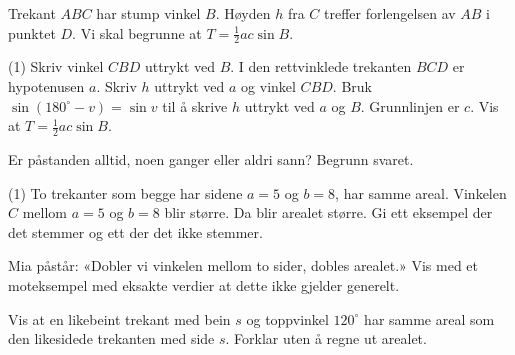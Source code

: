 Trekant $ABC$ har stump vinkel $B$. Høyden $h$ fra $C$ treffer forlengelsen av $AB$ i punktet $D$. Vi skal begrunne at $T = \frac12 ac\sin B$.\par
\begin{minipage}[t]{0.38\linewidth}
\end{minipage}\hfill
\begin{minipage}[t]{0.58\linewidth}
\begin{tasks}(1)
  \task Skriv vinkel $CBD$ uttrykt ved $B$.
  \task I den rettvinklede trekanten $BCD$ er hypotenusen $a$. Skriv $h$ uttrykt ved $a$ og vinkel $CBD$.
  \task Bruk $\sin(180^\circ - v) = \sin v$ til å skrive $h$ uttrykt ved $a$ og $B$.
  \task Grunnlinjen er $c$. Vis at $T = \frac12 ac\sin B$.
\end{tasks}
\end{minipage}


Er påstanden alltid, noen ganger eller aldri sann? Begrunn svaret.
\begin{tasks}(1)
  \task To trekanter som begge har sidene $a = 5$ og $b = 8$, har samme areal.
  \task Vinkelen $C$ mellom $a = 5$ og $b = 8$ blir større. Da blir arealet større. Gi ett eksempel der det stemmer og ett der det ikke stemmer.
\end{tasks}

Mia påstår: «Dobler vi vinkelen mellom to sider, dobles arealet.»
Vis med et moteksempel med eksakte verdier at dette ikke gjelder generelt.

Vis at en likebeint trekant med bein $s$ og toppvinkel $120^\circ$ har samme areal som den likesidede trekanten med side $s$.
Forklar uten å regne ut arealet.


